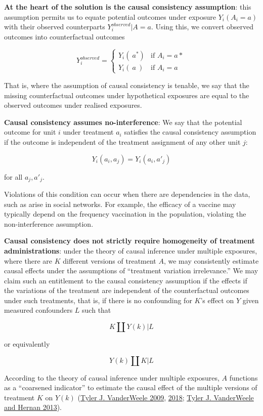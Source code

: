 \documentclass[
  singlecolumn]{report}
\begin{document}
\textbf{At the heart of the solution is the causal consistency
assumption}: this assumption permits us to equate potential outcomes
under exposure \(Y_i(A_i=a)\) with their observed counterparts
\(Y_i^{observed}|A=a\). Using this, we convert observed outcomes into
counterfactual outcomes

\[
Y^{observed}_i = 
\begin{cases} 
Y_i(~a^*) & \text{if } A_i = a* \\
Y_i(~a~) & \text{if } A_i = a
\end{cases}
\]

That is, where the assumption of causal consistency is tenable, we say
that the missing counterfactual outcomes under hypothetical exposures
are equal to the observed outcomes under realised exposures.

\textbf{Causal consistency assumes no-interference}: We say that the
potential outcome for unit \(i\) under treatment \(a_i\) satisfies the
causal consistency assumption if the outcome is independent of the
treatment assignment of any other unit \(j\):

\[
Y_i(a_i, a_j) = Y_i(a_i, a'_j)
\]

for all \(a_j, a'_j\).

Violations of this condition can occur when there are dependencies in
the data, such as arise in social networks. For example, the efficacy of
a vaccine may typically depend on the frequency vaccination in the
population, violating the non-interference assumption.

\textbf{Causal consistency does not strictly require homogeneity of
treatment administrations}: under the theory of causal inference under
multiple exposures, where there are \(K\) different versions of
treatment \(A\), we may consistently estimate causal effects under the
assumptions of ``treatment variation irrelevance.'' We may claim such an
entitlement to the causal consistency assumption if the effects if the
variations of the treatment are independent of the counterfactual
outcomes under such treatments, that is, if there is no confounding for
\(K\)'s effect on \(Y\) given measured confounders \(L\) such that

\[
K \coprod Y(k) | L
\]

or equivalently

\[
Y(k) \coprod K | L
\]

According to the theory of causal inference under multiple exposures,
\(A\) functions as a ``coarsened indicator'' to estimate the causal
effect of the multiple versions of treatment \(K\) on \(Y(k)\)
(\protect\hyperlink{ref-vanderweele2009}{Tyler J. VanderWeele 2009},
\protect\hyperlink{ref-vanderweele2018}{2018};
\protect\hyperlink{ref-vanderweele2013}{Tyler J. VanderWeele and Hernan
2013}).
\end{document}
